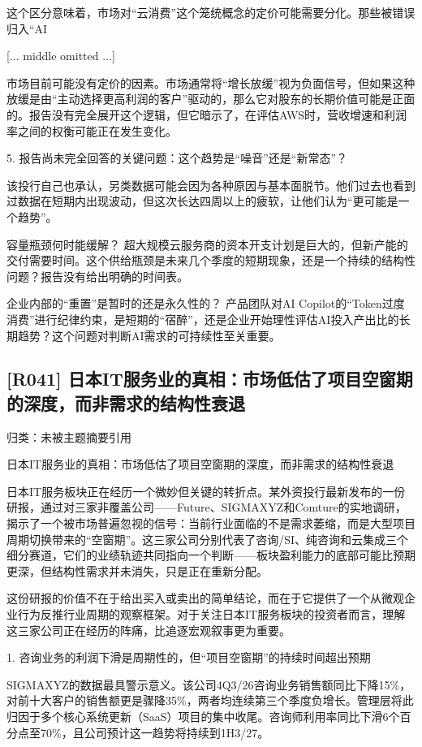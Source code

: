 \documentclass[11pt]{ctexart}
\begin{document}
这个区分意味着，市场对“云消费”这个笼统概念的定价可能需要分化。那些被错误归入“AI

[... middle omitted ...]

市场目前可能没有定价的因素。市场通常将“增长放缓”视为负面信号，但如果这种放缓是由“主动选择更高利润的客户”驱动的，那么它对股东的长期价值可能是正面的。报告没有完全展开这个逻辑，但它暗示了，在评估AWS时，营收增速和利润率之间的权衡可能正在发生变化。

5. 报告尚未完全回答的关键问题：这个趋势是“噪音”还是“新常态”？

该投行自己也承认，另类数据可能会因为各种原因与基本面脱节。他们过去也看到过数据在短期内出现波动，但这次长达四周以上的疲软，让他们认为“更可能是一个趋势”。

容量瓶颈何时能缓解？ 超大规模云服务商的资本开支计划是巨大的，但新产能的交付需要时间。这个供给瓶颈是未来几个季度的短期现象，还是一个持续的结构性问题？报告没有给出明确的时间表。

企业内部的“重置”是暂时的还是永久性的？ 产品团队对AI Copilot的“Token过度消费”进行纪律约束，是短期的“宿醉”，还是企业开始理性评估AI投入产出比的长期趋势？这个问题对判断AI需求的可持续性至关重要。

\subsection{[R041] 日本IT服务业的真相：市场低估了项目空窗期的深度，而非需求的结构性衰退}
{\small\color{refgray}归类：未被主题摘要引用}

日本IT服务业的真相：市场低估了项目空窗期的深度，而非需求的结构性衰退

日本IT服务板块正在经历一个微妙但关键的转折点。某外资投行最新发布的一份研报，通过对三家非覆盖公司——Future、SIGMAXYZ和Comture的实地调研，揭示了一个被市场普遍忽视的信号：当前行业面临的不是需求萎缩，而是大型项目周期切换带来的“空窗期”。这三家公司分别代表了咨询/SI、纯咨询和云集成三个细分赛道，它们的业绩轨迹共同指向一个判断——板块盈利能力的底部可能比预期更深，但结构性需求并未消失，只是正在重新分配。

这份研报的价值不在于给出买入或卖出的简单结论，而在于它提供了一个从微观企业行为反推行业周期的观察框架。对于关注日本IT服务板块的投资者而言，理解这三家公司正在经历的阵痛，比追逐宏观叙事更为重要。

1. 咨询业务的利润下滑是周期性的，但“项目空窗期”的持续时间超出预期

SIGMAXYZ的数据最具警示意义。该公司4Q3/26咨询业务销售额同比下降15\%，对前十大客户的销售额更是骤降35\%，两者均连续第三个季度负增长。管理层将此归因于多个核心系统更新（SaaS）项目的集中收尾。咨询师利用率同比下滑6个百分点至70\%，且公司预计这一趋势将持续到1H3/27。
\end{document}
